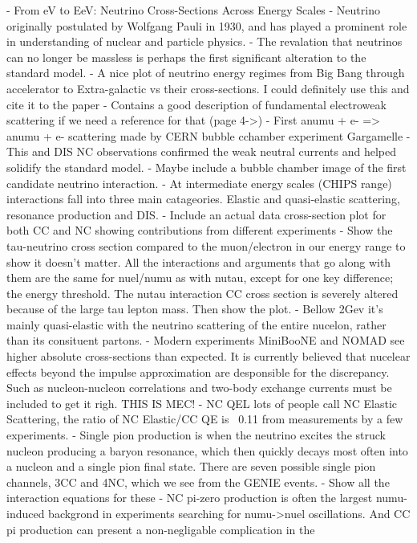 - From eV to EeV: Neutrino Cross-Sections Across Energy Scales
- Neutrino originally postulated by Wolfgang Pauli in 1930, and has played a prominent role in
understanding of nuclear and particle physics.
- The revalation that neutrinos can no longer be massless is perhaps the first significant
alteration to the standard model.
- A nice plot of neutrino energy regimes from Big Bang through accelerator to Extra-galactic vs
their cross-sections. I could definitely use this and cite it to the paper
- Contains a good description of fundamental electroweak scattering if we need a reference for
that (page 4->)
- First anumu + e- => anumu + e- scattering made by CERN bubble cchamber experiment Gargamelle
- This and DIS NC observations confirmed the weak neutral currents and helped solidify the
standard model.
- Maybe include a bubble chamber image of the first candidate neutrino interaction.
- At intermediate energy scales (CHIPS range) interactions fall into three main catageories.
Elastic and quasi-elastic scattering, resonance production and DIS.
- Include an actual data cross-section plot for both CC and NC showing contributions from
different experiments
- Show the tau-neutrino cross section compared to the muon/electron in our energy range to show it
doesn't matter. All the interactions and arguments that go along with them are the same for
nuel/numu as with nutau, except for one key difference; the energy threshold. The nutau
interaction CC cross section is severely altered because of the large tau lepton mass. Then
show the plot.
- Bellow 2Gev it's mainly quasi-elastic with the neutrino scattering of the entire nucelon, rather
than its consituent partons.
- Modern experiments MiniBooNE and NOMAD see higher absolute cross-sections than expected. It is
currently believed that nucelear effects beyond the impulse approximation are desponsible for the
discrepancy. Such as nucleon-nucleon correlations and two-body exchange currents must be included
to get it righ. THIS IS MEC!
- NC QEL lots of people call NC Elastic Scattering, the ratio of NC Elastic/CC QE is ~0.11 from
measurements by a few experiments.
- Single pion production is when the neutrino excites the struck nucleon producing a baryon
resonance, which then quickly decays most often into a nucleon and a single pion final state.
There are seven possible single pion channels, 3CC and 4NC, which we see from the GENIE events.
- Show all the interaction equations for these %
- NC pi-zero production is often the largest numu-induced backgrond in experiments searching for
numu->nuel oscillations. And CC pi production can present a non-negligable complication in the
